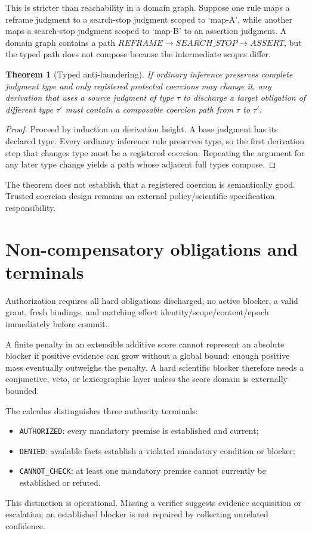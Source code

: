 \documentclass[11pt]{article}
\newtheorem{theorem}{Theorem}
\begin{document}
This is stricter than reachability in a domain graph. Suppose one rule maps a reframe judgment to a search-stop judgment scoped to `map-A', while another maps a search-stop judgment scoped to `map-B' to an assertion judgment. A domain graph contains a path $REFRAME\to SEARCH\_STOP\to ASSERT$, but the typed path does not compose because the intermediate scopes differ.

\begin{theorem}[Typed anti-laundering]
If ordinary inference preserves complete judgment type and only registered protected coercions may change it, any derivation that uses a source judgment of type $\tau$ to discharge a target obligation of different type $\tau'$ must contain a composable coercion path from $\tau$ to $\tau'$.
\end{theorem}
\begin{proof}
Proceed by induction on derivation height. A base judgment has its declared type. Every ordinary inference rule preserves type, so the first derivation step that changes type must be a registered coercion. Repeating the argument for any later type change yields a path whose adjacent full types compose.
\end{proof}

The theorem does not establish that a registered coercion is semantically good. Trusted coercion design remains an external policy/scientific specification responsibility.

\section{Non-compensatory obligations and terminals}
Authorization requires all hard obligations discharged, no active blocker, a valid grant, fresh bindings, and matching effect identity/scope/content/epoch immediately before commit.

A finite penalty in an extensible additive score cannot represent an absolute blocker if positive evidence can grow without a global bound: enough positive mass eventually outweighs the penalty. A hard scientific blocker therefore needs a conjunctive, veto, or lexicographic layer unless the score domain is externally bounded.

The calculus distinguishes three authority terminals:
\begin{itemize}
\item \texttt{AUTHORIZED}: every mandatory premise is established and current;
\item \texttt{DENIED}: available facts establish a violated mandatory condition or blocker;
\item \texttt{CANNOT\_CHECK}: at least one mandatory premise cannot currently be established or refuted.
\end{itemize}
This distinction is operational. Missing a verifier suggests evidence acquisition or escalation; an established blocker is not repaired by collecting unrelated confidence.
\end{document}
